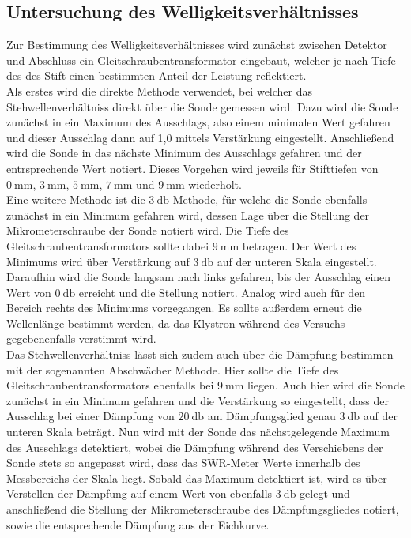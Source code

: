 \subsection{Untersuchung des Welligkeitsverhältnisses}
Zur Bestimmung des Welligkeitsverhältnisses wird zunächst zwischen Detektor und Abschluss ein
Gleitschraubentransformator eingebaut, welcher je nach Tiefe des des Stift einen bestimmten
Anteil der Leistung reflektiert. \\
Als erstes wird die direkte Methode verwendet, bei welcher das Stehwellenverhältniss direkt über die
Sonde gemessen wird. Dazu wird die Sonde zunächst in ein Maximum des Ausschlags, also einem minimalen
Wert gefahren und dieser Ausschlag dann auf 1,0 mittels Verstärkung eingestellt. Anschließend
wird die Sonde in das nächste Minimum des Ausschlags gefahren und der entrsprechende Wert notiert.
Dieses Vorgehen wird jeweils für Stifttiefen von $\SI{0}{\milli\meter}$, $\SI{3}{\milli\meter}$,
$\SI{5}{\milli\meter}$, $\SI{7}{\milli\meter}$ und $\SI{9}{\milli\meter}$ wiederholt. \\
Eine weitere Methode ist die $\SI{3}{\decibel}$ Methode, für welche die Sonde ebenfalls zunächst in
ein Minimum gefahren wird, dessen Lage über die Stellung der Mikrometerschraube der Sonde notiert wird.
Die Tiefe des Gleitschraubentransformators sollte dabei $\SI{9}{\milli\meter}$ betragen.
Der Wert des Minimums wird über Verstärkung auf $\SI{3}{\decibel}$ auf der unteren
Skala eingestellt. Daraufhin wird die Sonde langsam nach links gefahren, bis der Ausschlag einen
Wert von $\SI{0}{\decibel}$ erreicht und die Stellung notiert. Analog wird auch für den Bereich rechts des Minimums
vorgegangen. Es sollte außerdem erneut die Wellenlänge bestimmt werden, da das Klystron während des
Versuchs gegebenenfalls verstimmt wird. \\
Das Stehwellenverhältniss lässt sich zudem auch über die Dämpfung bestimmen mit der sogenannten Abschwächer
Methode. Hier sollte die Tiefe des Gleitschraubentransformators ebenfalls bei $\SI{9}{\milli\meter}$ liegen.
Auch hier wird die Sonde zunächst in ein Minimum gefahren und die Verstärkung so eingestellt, dass der Ausschlag bei
einer Dämpfung von $\SI{20}{\decibel}$ am Dämpfungsglied genau $\SI{3}{\decibel}$ auf der unteren Skala
beträgt. Nun wird mit der Sonde das nächstgelegende Maximum des Ausschlags detektiert, wobei die
Dämpfung während des Verschiebens der Sonde stets so angepasst wird, dass das SWR-Meter Werte innerhalb des
Messbereichs der Skala liegt. Sobald das Maximum detektiert ist, wird es über Verstellen der Dämpfung
auf einem Wert von ebenfalls $\SI{3}{\decibel}$ gelegt und anschließend die Stellung der Mikrometerschraube
des Dämpfungsgliedes notiert, sowie die entsprechende Dämpfung aus der Eichkurve.
